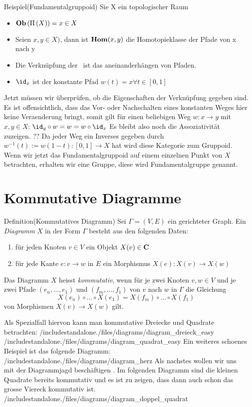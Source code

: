 \documentclass{article}
\begin{document}
		 
		 Beispiel(Fundamentalgruppoid)\cite[ Aufgabe 2.24 ]{Bra}
		 Sie X ein topologischer Raum
		\begin{itemize}
			\item \( \mathbf{Ob}  \left( \Pi \left( X \right) \right) = x \in X \)
			 \item Seien \( x ,y \in X ) \), dann ist \(  \mathbf{Hom } (x,y) \) die Homotopieklasse der Pfade von x nach y
			 \item Die Verkn\"upfung der \Hom \ ist das aneinanderh\"angen von Pfaden.
			 \item \(  \id_x \) ist der konstante Pfad \( w(t)=x \forall t \in [0,1] \)
		\end{itemize}
		Jetzt m\"ussen wir \"uberpr\"ufen, ob die Eigenschaften der Verkn\"upfung gegeben sind.
		Es ist offensichtlich, dass das Vor- oder Nachschalten eines konstanten Weges hier keine Veraenderung bringt, somit gilt f\"ur einen beliebigen Weg 
		\(w:x \to y \) mit \( x,y \in X\):
		\( \id_y \circ w = w = w \circ \id_x \)
		Es bleibt also noch die Assoziativit\"at zuzeigen.
		??
		Da jeder Weg ein Inverses gegeben durch \( w^{-1}(t):=w(1-t): [0,1] \to X \) hat wird diese Kategorie zum Gruppoid.
		Wenn wir jetzt das Fundamentalgruppoid auf einem einzelnen Punkt von \( X \) betrachten, erhalten wir eine Gruppe, diese wird Fundamentalgruppe genannt.
		
	
	\section{Kommutative Diagramme}
		Definition(Kommutatives Diagramm) \cite[Definition 2.4.3]{Bra}
		Sei \( \Gamma =(V,E) \) ein gerichteter Graph. Ein  \emph{Diagramm} $X$ in der Form \( \Gamma \) besteht aus den folgenden Daten:
		\begin{enumerate}
			\item f\"ur jeden Knoten \( v \in V \) ein  Objekt \( X(v) \in \mathbf{C} \)
			\item f\"ur jede Kante \( e:v \to w \) in \( E \) ein Morphismus \( X(e):X(v) \to X(w) \)  
		\end{enumerate}
		Das Diagramm $X$ heisst \emph{kommutativ}, wenn f\"ur je zwei Knoten \(v,w \in V \) und je zwei Pfade \( \left(e_n, \dots ,e_1\right) \) und \( \left(f_m, \dots ,f_1\right) \) von $v $ nach $w$ in $\Gamma $ die Gleichung 
		\[
			X(e_n) \circ \dots \circ X(e_1) = X(f_m) \circ \dots \circ X(f_1)
		\]
		von Morphismen \( X(v) \to X(w) \) gilt.
		
		Als Spezialfall hiervon kann man kommutative Dreiecke und Quadrate betrachten:
 		/includestandalone{./files/diagrams/diagram_dreieck_easy}
		/includestandalone{./files/diagrams/diagram_quadrat_easy}		 
		Ein weiteres schoenes Beispiel ist das folgende Diagramm:
		/includestandalone{./files/diagrams/diagram_herz}
		Als nachstes wollen wir uns mit der Diagrammjagd besch\"aftigen \cite[Beispiel 2.4.7]{Bra}.
		Im folgenden Diagramm sind die kleinen Quadrate bereits kommutativ und es ist zu zeigen, dass dann auch schon das grosse Viereck kommutativ ist.
		/includestandalone{./files/diagrams/diagram_doppel_quadrat}
		
\end{document}
